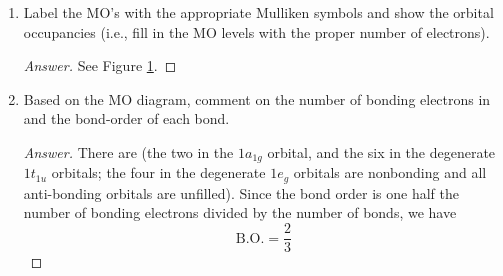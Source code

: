 \documentclass[../psets.tex]{subfiles}
\begin{document}
\begin{enumerate}[label={\Roman*)}]
\begin{enumerate}[label={\alph*)}]
\begin{proof}[Answer]
\begin{figure}[h!]
                \caption{ orbital diagram.}
                \label{fig:orbitalDiagram-SF6}
            \end{figure}
        \end{proof}
        \item Label the MO's with the appropriate Mulliken symbols and show the orbital occupancies (i.e., fill in the MO levels with the proper number of electrons).
        \begin{proof}[Answer]
            See Figure \ref{fig:orbitalDiagram-SF6}.
        \end{proof}
        \item Based on the MO diagram, comment on the number of bonding electrons in  and the bond-order of each  bond.
        \begin{proof}[Answer]
            There are  (the two in the $1a_{1g}$ orbital, and the six in the degenerate $1t_{1u}$ orbitals; the four in the degenerate $1e_g$ orbitals are nonbonding and all anti-bonding orbitals are unfilled). Since the bond order is one half the number of bonding electrons divided by the number of bonds, we have
            \begin{equation*}
                \boxed{\text{B.O.} = \frac{2}{3}}
            \end{equation*}
        \end{proof}
    \end{enumerate}
\end{enumerate}


\end{document}
